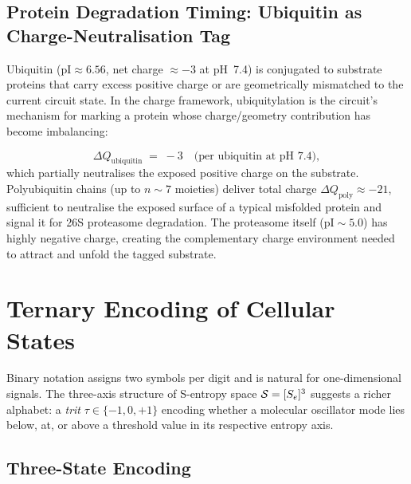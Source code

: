 \subsection{Protein Degradation Timing: Ubiquitin as Charge-Neutralisation Tag}

Ubiquitin ($\mathrm{pI}\approx 6.56$, net charge $\approx -3$ at pH~7.4) is
conjugated to substrate proteins that carry excess positive charge or are
geometrically mismatched to the current circuit state.  In the charge
framework, ubiquitylation is the circuit's mechanism for marking a protein
whose charge/geometry contribution has become imbalancing:

\begin{equation}
    \Delta Q_{\mathrm{ubiquitin}} \;=\; -3\quad \text{(per ubiquitin at pH~7.4)},
    \label{eq:ch03-ubiquitin-charge}
\end{equation}
which partially neutralises the exposed positive charge on the substrate.
Polyubiquitin chains (up to $n\sim 7$ moieties) deliver total charge
$\Delta Q_{\mathrm{poly}}\approx -21$, sufficient to neutralise the exposed
surface of a typical misfolded protein and signal it for 26S proteasome
degradation.  The proteasome itself ($\mathrm{pI}\sim 5.0$) has highly
negative charge, creating the complementary charge environment needed to
attract and unfold the tagged substrate.

\section{Ternary Encoding of Cellular States}
\label{sec:ch03-ternary-encoding}

Binary notation assigns two symbols per digit and is natural for
one-dimensional signals.  The three-axis structure of S-entropy space
$\mathcal{S}=[S_e]^3$ suggests a richer alphabet: a \emph{trit}
$\tau\in\{-1,0,+1\}$ encoding whether a molecular oscillator mode lies
below, at, or above a threshold value in its respective entropy axis.

\subsection{Three-State Encoding}

